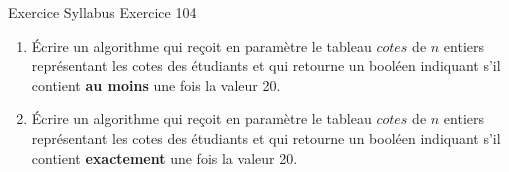 \begin{frame}{Exercice \theexercice}{Syllabus Exercice 104}
    \begin{enumerate}
        \item Écrire un algorithme qui reçoit en paramètre le tableau
        $cotes$ de $n$ entiers représentant les cotes des étudiants
        et qui retourne un booléen indiquant s’il contient \textbf{au
        moins} une fois la valeur 20.

        \item Écrire un algorithme qui reçoit en paramètre le tableau
        $cotes$ de $n$ entiers représentant les cotes des étudiants
        et qui retourne un booléen indiquant s’il contient
        \textbf{exactement} une fois la valeur 20.

    \end{enumerate}
\end{frame}